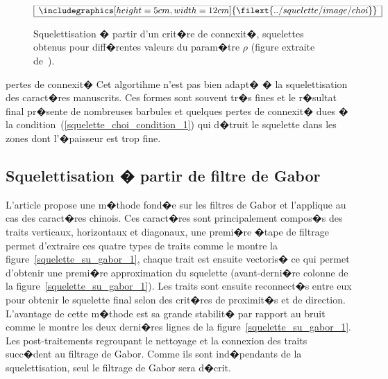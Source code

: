             \begin{figure}[ht]
        $$\frame{$\begin{array}[c]{c}\includegraphics[height=5cm, width=12cm]
        {\filext{../squelette/image/choi}}\end{array}$}$$
        \caption{    Squelettisation � partir d'un crit�re de connexit�, squelettes obtenus pour
                            diff�rentes valeurs du param�tre $\rho$ (figure extraite de~).}
        \label{squelette_choi_connexite}
            \end{figure}



\begin{xremark}{pertes de connexit�}
Cet algortihme n'est pas bien adapt� � la squelettisation des caract�res manuscrits. Ces formes sont souvent tr�s fines et le r�sultat final pr�sente de nombreuses barbules et quelques pertes de connexit� dues � la condition~(\ref{squelette_choi_condition_1}) qui d�truit le squelette dans les zones dont l'�paisseur est trop fine.
\end{xremark}











\subsection{Squelettisation � partir de filtre de Gabor}
\label{ske_squelettisation_gabor}

L'article  propose une m�thode fond�e sur les filtres de Gabor et l'applique au cas des caract�res chinois. Ces caract�res sont principalement compos�s des traits verticaux, horizontaux et diagonaux, une premi�re �tape de filtrage permet d'extraire ces quatre types de traits comme le montre la figure~\ref{squelette_su_gabor_1}, chaque trait est ensuite vectoris� ce qui permet d'obtenir une premi�re approximation du squelette (avant-derni�re colonne de la figure~\ref{squelette_su_gabor_1}). Les traits sont ensuite reconnect�s entre eux pour obtenir le squelette final selon des crit�res de proximit�s et de direction. L'avantage de cette m�thode est sa grande stabilit� par rapport au bruit comme le montre les deux derni�res lignes de la figure~\ref{squelette_su_gabor_1}. Les post-traitements regroupant le nettoyage et la connexion des traits succ�dent au filtrage de Gabor. Comme ils sont ind�pendants de la squelettisation, seul le filtrage de Gabor sera d�crit.


